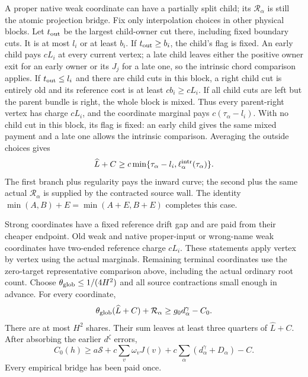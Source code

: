 A proper native weak coordinate can have a partially split child;
its $\mathcal R_\alpha$ is still the atomic projection bridge.
Fix only interpolation choices in other physical blocks. Let
$t_{\rm out}$ be the largest child-owner cut there, including fixed
boundary cuts. It is at most $l_i$ or at least $b_i$.
If $t_{\rm out}\ge b_i$, the child's flag is fixed. An early child
pays $cL_i$ at every current vertex; a late child leaves either the
positive owner exit for an early owner or its $J_j$ for a late one,
so the intrinsic chord comparison applies.
If $t_{\rm out}\le l_i$ and there are child cuts in this block,
a right child cut is entirely old and its reference cost is at least
$c b_i\ge cL_i$. If all child cuts are left but the parent bundle
is right, the whole block is mixed. Thus every parent-right vertex
has charge $cL_i$, and the coordinate marginal pays
$c(\tau_\alpha-l_i)$. With no child cut in this block, its flag is
fixed: an early child gives the same mixed payment and a late one
allows the intrinsic comparison. Averaging the outside choices gives
\begin{equation}
 \widehat L+C\ge c\min\{\tau_\alpha-l_i,
                         \ell_\alpha^{\rm intr}(\tau_\alpha)\}.
 \label{history:partial-child}
\end{equation}
The first branch plus regularity pays the inward curve; the second
plus the same actual $\mathcal R_\alpha$ is supplied by the contracted
source wall. The identity $\min(A,B)+E=\min(A+E,B+E)$ completes
this case.

Strong coordinates have a fixed reference drift gap and are paid
from their cheaper endpoint. Old weak and native proper-input or
wrong-name weak coordinates have two-ended reference charge $cL_i$.
These statements apply vertex by vertex using the actual marginals.
Remaining terminal coordinates use the zero-target representative
comparison above, including the actual ordinary root count. Choose
$\theta_{\rm glob}\le1/(4H^2)$ and all source contractions small
enough in advance. For every coordinate,
\[
 \theta_{\rm glob}(\widehat L+C)+\mathcal R_\alpha
                         \ge g_0d_\alpha^\gamma-C_0.
\]
There are at most $H^2$ shares. Their sum leaves at least three quarters
of $\widehat L+C$. After absorbing the earlier $d^\zeta$ errors,
\begin{equation}
 C_0(h)\ge a\mathcal S+c\sum_v\omega_vJ(v)
                      +c\sum_\alpha(d_\alpha^\gamma+D_\alpha)-C.
 \label{history:star-interpolated}
\end{equation}
Every empirical bridge has been paid once.

